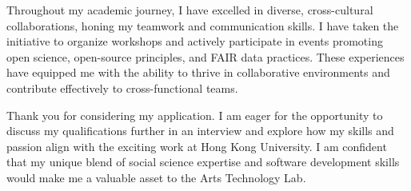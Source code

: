 \documentclass[11pt, a4paper]{awesome-cv}
\begin{document}
\begin{cvletter}
Throughout my academic journey, I have excelled in diverse, cross-cultural collaborations, honing my teamwork and communication skills. I have taken the initiative to organize workshops and actively participate in events promoting open science, open-source principles, and FAIR data practices. These experiences have equipped me with the ability to thrive in collaborative environments and contribute effectively to cross-functional teams.

Thank you for considering my application. I am eager for the opportunity to discuss my qualifications further in an interview and explore how my skills and passion align with the exciting work at Hong Kong University. I am confident that my unique blend of social science expertise and software development skills would make me a valuable asset to the Arts Technology Lab.



\end{cvletter}


\makeletterclosing
\end{document}
